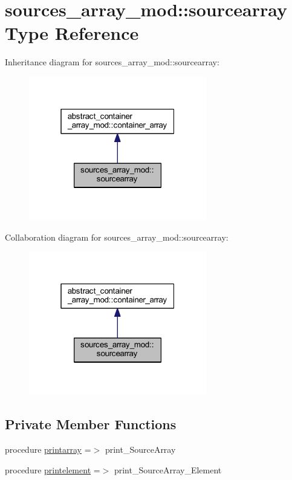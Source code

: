 \hypertarget{structsources__array__mod_1_1sourcearray}{}\section{sources\+\_\+array\+\_\+mod\+:\+:sourcearray Type Reference}
\label{structsources__array__mod_1_1sourcearray}


Inheritance diagram for sources\+\_\+array\+\_\+mod\+:\+:sourcearray\+:
\nopagebreak
\begin{figure}[H]
\begin{center}
\leavevmode
\includegraphics[width=220pt]{structsources__array__mod_1_1sourcearray__inherit__graph}
\end{center}
\end{figure}


Collaboration diagram for sources\+\_\+array\+\_\+mod\+:\+:sourcearray\+:
\nopagebreak
\begin{figure}[H]
\begin{center}
\leavevmode
\includegraphics[width=220pt]{structsources__array__mod_1_1sourcearray__coll__graph}
\end{center}
\end{figure}
\subsection*{Private Member Functions}
\begin{DoxyCompactItemize}
\item 
procedure \hyperlink{structsources__array__mod_1_1sourcearray_a4200722231b4dfefa4f096b235d911e6}{printarray} =$>$ print\+\_\+\+Source\+Array
\item 
procedure \hyperlink{structsources__array__mod_1_1sourcearray_a72a537b29e5b5cf3ba35745cb7b41524}{printelement} =$>$ print\+\_\+\+Source\+Array\+\_\+\+Element
\end{DoxyCompactItemize}


